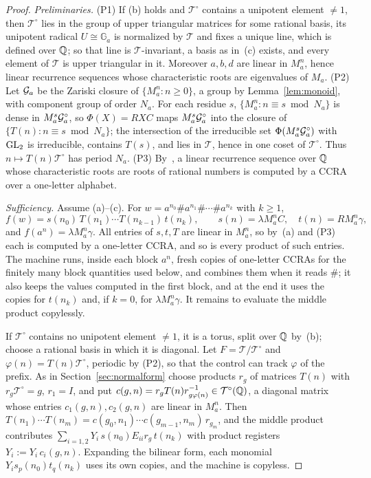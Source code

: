 \begin{proof}
\emph{Preliminaries.} (P1) If (b) holds and $\mathcal T^\circ$ contains a unipotent element $\ne1$, then $\mathcal T^\circ$ lies in the group of upper triangular matrices for some rational basis, its unipotent radical $U\cong\mathbb G_a$ is normalized by $\mathcal T$ and fixes a unique line, which is defined over $\mathbb{Q}$; so that line is $\mathcal T$-invariant, a basis as in~(c) exists, and every element of $\mathcal T$ is upper triangular in it. Moreover $a,b,d$ are linear in $M_a^n$, hence linear recurrence sequences whose characteristic roots are eigenvalues of $M_a$. (P2) Let $\mathcal{G}_a$ be the Zariski closure of $\{M_a^n:n\ge0\}$, a group by Lemma~\ref{lem:monoid}, with component group of order $N_a$. For each residue $s$, $\{M_a^n:n\equiv s\bmod N_a\}$ is dense in $M_a^s\mathcal{G}_a^\circ$, so $\Phi(X)=RXC$ maps $M_a^s\mathcal{G}_a^\circ$ into the closure of $\{T(n):n\equiv s\bmod N_a\}$; the intersection of the irreducible set $\Phi(M_a^s\mathcal{G}_a^\circ)$ with $\mathrm{GL}_2$ is irreducible, contains $T(s)$, and lies in $\mathcal T$, hence in one coset of $\mathcal T^\circ$. Thus $n\mapsto T(n)\mathcal T^\circ$ has period $N_a$. (P3) By~\cite{BFLM22}, a linear recurrence sequence over $\mathbb{Q}$ whose characteristic roots are roots of rational numbers is computed by a CCRA over a one-letter alphabet.

\emph{Sufficiency.} Assume (a)--(c). For $w=a^{n_0}\#a^{n_1}\#\cdots\#a^{n_k}$ with $k\ge1$,
\begin{equation}\label{eq:blockform}
f(w)=s(n_0)\,T(n_1)\cdots T(n_{k-1})\,t(n_k),\qquad s(n)=\lambda M_a^nC,\quad t(n)=RM_a^n\gamma,
\end{equation}
and $f(a^n)=\lambda M_a^n\gamma$. All entries of $s,t,T$ are linear in $M_a^n$, so by~(a) and (P3) each is computed by a one-letter CCRA, and so is every product of such entries. The machine runs, inside each block $a^{n}$, fresh copies of one-letter CCRAs for the finitely many block quantities used below, and combines them when it reads $\#$; it also keeps the values computed in the first block, and at the end it uses the copies for $t(n_k)$ and, if $k=0$, for $\lambda M_a^n\gamma$. It remains to evaluate the middle product copylessly.

If $\mathcal T^\circ$ contains no unipotent element $\ne1$, it is a torus, split over $\mathbb{Q}$ by~(b); choose a rational basis in which it is diagonal. Let $F=\mathcal T/\mathcal T^\circ$ and $\varphi(n)=T(n)\mathcal T^\circ$, periodic by (P2), so that the control can track $\varphi$ of the prefix. As in Section~\ref{sec:normalform} choose products $r_g$ of matrices $T(n)$ with $r_g\mathcal T^\circ=g$, $r_1=I$, and put $c(g,n)=r_gT(n)r_{g\varphi(n)}^{-1}\in\mathcal T^\circ(\mathbb{Q})$, a diagonal matrix whose entries $c_1(g,n),c_2(g,n)$ are linear in $M_a^n$. Then $T(n_1)\cdots T(n_m)=c(g_0,n_1)\cdots c(g_{m-1},n_m)\,r_{g_m}$, and the middle product contributes $\sum_{i=1,2}Y_i\,s(n_0)E_{ii}r_{g}\,t(n_k)$ with product registers $Y_i:=Y_i\,c_i(g,n)$. Expanding the bilinear form, each monomial $Y_is_p(n_0)t_q(n_k)$ uses its own copies, and the machine is copyless.


\end{proof}
